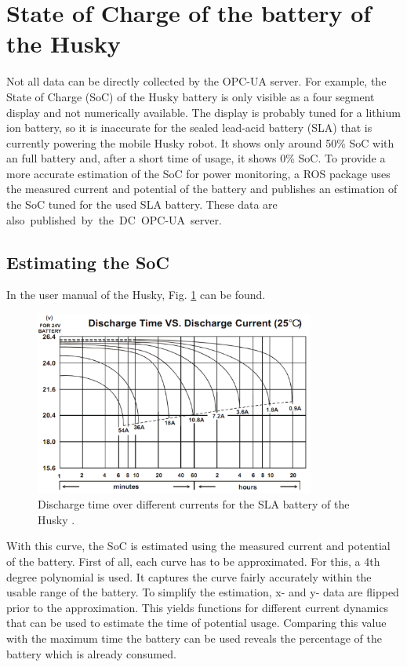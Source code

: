 \documentclass[conference]{IEEEtran}
\begin{document}
\section{State of Charge of the  battery of the Husky}
Not all data can be directly collected by the OPC-UA server.
For example, the State of Charge (SoC) of the Husky battery is only visible as a four segment display and not numerically available.
The display is probably tuned for a lithium ion battery, so it is  inaccurate for the sealed lead-acid battery (SLA) that is currently powering the mobile Husky robot. It shows only around 50\% SoC with an full battery and, after a short time of usage, it shows 0\% SoC.
To provide a more accurate estimation of the SoC for power monitoring, a ROS package uses the measured current and potential of the battery and publishes an estimation of the SoC tuned for the used SLA battery.
These data are \mbox{also published by the DC OPC-UA server.}
\subsection{Estimating the SoC}
In the user manual of the Husky, Fig. \ref{fig:EndladekuvenSLA} can be found.
\begin{figure}[b]
    \centerline{\includegraphics[width=9.2cm]{Pictures/EndladekuvenSLA.png}}
    \caption{Discharge time over different currents for the SLA battery of the Husky \cite[p.21]{SLAKurven}.}
    \label{fig:EndladekuvenSLA}
\end{figure}
With this curve, the SoC is estimated using the measured current and potential of the battery.
First of all, each curve has to be approximated. For this, a 4th degree polynomial is used.
It captures the curve fairly accurately within the usable range of the battery.
To simplify the estimation,  x- and y- data are flipped prior to the approximation.
This yields functions for different current dynamics that can be used to estimate the time of potential usage.
Comparing this value with the maximum time the battery can be used reveals the percentage of the battery which is already consumed.
\end{document}
